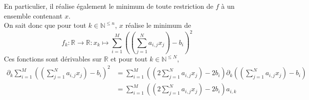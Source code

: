 \documentclass[a4paper, 10pt]{article}
\newcommand{\IR}{\mathbb{R}}
\newcommand{\IN}{\mathbb{N}}
\begin{document}
En particulier, il réalise également le minimum de toute restriction de \( f \) à un ensemble contenant \( x \). \\
On sait donc que pour tout \( k \in \IN^{\leq n} \), \( x \) réalise le minimum de
$$
f_k : \IR \to \IR : x_k \mapsto \sum_{i = 1}^M \left( \left( \sum_{j = 1}^N a_{i, j} x_j \right) - b_i \right)^2
$$
Ces fonctions sont dérivables sur \( \IR \) et pour tout \( k \in \IN^{\leq N} \),
\begin{align*}
    \partial_k \sum_{i = 1}^M \left( \left( \sum_{j = 1}^N a_{i, j} x_j \right) - b_i \right)^2
    & = \sum_{i = 1}^M \left( \left( 2 \sum_{j = 1}^N a_{i, j} x_j \right) - 2 b_i \right) \partial_k \left( \left( \sum_{j = 1}^N a_{i, j} x_j \right) - b_i \right) \\
    & = \sum_{i = 1}^M \left( \left( 2 \sum_{j = 1}^N a_{i, j} x_j \right) - 2 b_i \right) a_{i, k}
\end{align*}

\newpage
\end{document}
